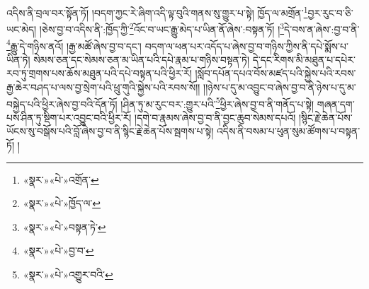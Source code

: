 འདིས་ནི་བྲལ་བར་སྟོན་ཏོ། །བདག་ཀྱང་རེ་ཞིག་འདི་ལྟ་བུའི་གནས་སུ་གྱུར་པ་སྟེ། ཁྱོད་ལ་མགྲོན་\footnote{«སྣར་»«པེ་»འགྲོན་}བྱར་རུང་བ་ཅི་ཡང་མེད། །ཅེས་བྱ་བ་འདིས་ནི་:ཁྱོད་ཀྱི་\footnote{«སྣར་»«པེ་»ཁྱོད་ལ་}འོང་བ་ཡང་རྒྱུ་མེད་པ་ཡིན་ནོ་ཞེས་:བསྟན་ཏོ། །\footnote{«སྣར་»«པེ་»བསྟན་ཏེ་}དེ་བས་ན་ཞེས་:བྱ་བ་ནི་\footnote{«སྣར་»«པེ་»བྱ་བ་}རྒྱུ་དེ་གཉིས་ནའོ། །རྒྱ་མཚོ་ཞེས་བྱ་བ་དང་། བདག་ལ་ཕན་པར་འདོད་པ་ཞེས་བྱ་བ་གཉིས་ཀྱིས་ནི་དཔེ་སྨོས་པ་ཡིན་ཏེ། སེམས་ཅན་དང་སེམས་ཅན་མ་ཡིན་པའི་དཔེ་རྣམ་པ་གཉིས་བསྟན་ཏེ། དེ་དང་རིགས་མི་མཐུན་པ་དཔེར་རབ་ཏུ་གྲགས་པས་ཆོས་མཐུན་པའི་དཔེ་བསྟན་པའི་ཕྱིར་རོ། །སློབ་དཔོན་དཔའ་བོས་མཛད་པའི་སྐྱེས་པའི་རབས་རྒྱ་ཆེར་བཤད་པ་ལས་བྱ་སྲེག་པའི་ཕྲུ་གུའི་སྐྱེས་པའི་རབས་སོ།། །།ཉེས་པ་དུ་མ་འབྱུང་བ་ཞེས་བྱ་བ་ནི་ཉེས་པ་དུ་མ་བསྐྱེད་པའི་ཕྱིར་ཞེས་བྱ་བའི་དོན་ཏོ། །ཤིན་ཏུ་མ་རུང་བར་:གྱུར་པའི་\footnote{«སྣར་»«པེ་»འགྱུར་བའི་}ཕྱིར་ཞེས་བྱ་བ་ནི་གནོད་པ་སྟེ། གཞན་དག་པས་ཤིན་ཏུ་སྡིག་པར་འབྱུང་བའི་ཕྱིར་རོ། །དགེ་བ་རྣམས་ཞེས་བྱ་བ་ནི་བྱང་ཆུབ་སེམས་དཔའོ། །སྙིང་རྗེ་ཆེན་པོས་ཡོངས་སུ་བསྒོས་པའི་བློ་ཞེས་བྱ་བ་ནི་སྙིང་རྗེ་ཆེན་པོས་སྦགས་པ་སྟེ། འདིས་ནི་བསམ་པ་ཕུན་སུམ་ཚོགས་པ་བསྟན་ཏོ། །
